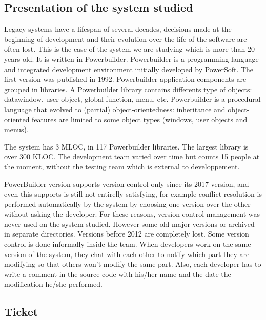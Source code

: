\documentclass[10pt,conference]{IEEEtran}
\begin{document}
\subsection{Presentation of the system studied}

Legacy systems have a lifespan of several decades, decisions made at the beginning of development and their evolution over the life of the software are often lost. 
This is the case of the system we are studying which is more than 20 years old. 
It is written in Powerbuilder.
Powerbuilder is a programming language and integrated development environment initially developed by PowerSoft. The first version was published in 1992.
Powerbuilder application components are grouped in libraries.  
A Powerbuilder library contains differents type of objects: datawindow, user object, global function,  menu, etc. 
Powerbuilder is a procedural language that evolved to (partial) object-orientedness: inheritance and object-oriented features are limited to some object types (windows, user objects and menus).    

The system has 3 MLOC, in 117 Powerbuilder libraries.
The  largest library is  over 300 KLOC.
The development team varied over time but counts 15 people at the moment, without the testing team which is external to developpement.

PowerBuilder version supports version control only since its 2017 version, and even this supports is still not entirelly satisfying, for example
conflict resolution is performed automatically by the system by choosing one version over the other without asking the developer.
For these reasons, version control management was never used on the system studied.%
However some old major versions or archived in separate directories.
Versions before 2012 are completely lost.
Some version control is done informally inside the team.
When developers work on the same version of the system, they chat with each other to notify which part they are modifying so that others won't modify the same part.
Also, each developer has to write a comment in the source code with his/her name and the date the modification he/she performed. 


\subsection{Ticket}
\end{document}
